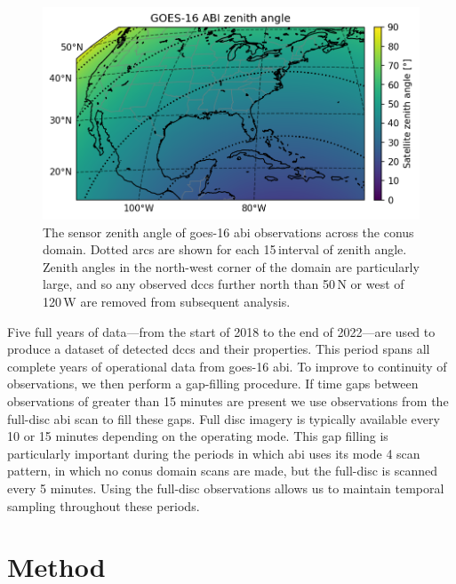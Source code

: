 \begin{figure}[tp]
    \centering
    \includegraphics[width=\textwidth]{figures/ch2_01.png}
    \caption[
    The sensor zenith angle of \acrshort{goes}-16 \acrshort{abi} observations across the \acrshort{conus} domain
    ]{
    The sensor zenith angle of \acrshort{goes}-16 \acrshort{abi} observations across the \acrshort{conus} domain. Dotted arcs are shown for each 15\,\textdegree interval of zenith angle. Zenith angles in the north-west corner of the domain are particularly large, and so any observed \acrshort{dcc}s further north than 50\,\textdegree N or west of 120\,\textdegree W are removed from subsequent analysis.
    }
    \label{fig:abi_zenith_angles}
\end{figure}

Five full years of data---from the start of 2018 to the end of 2022---are used to produce a dataset of detected \acrshort{dcc}s and their properties.
This period spans all complete years of operational data from \acrshort{goes}-16 \acrshort{abi}.
To improve to continuity of observations, we then perform a gap-filling procedure.
If time gaps between observations of greater than 15 minutes are present we use observations from the full-disc \acrshort{abi} scan to fill these gaps.
Full disc imagery is typically available every 10 or 15 minutes depending on the operating mode.
This gap filling is particularly important during the periods in which \acrshort{abi} uses its mode 4 scan pattern, in which no \acrshort{conus} domain scans are made, but the full-disc is scanned every 5 minutes.
Using the full-disc observations allows us to maintain temporal sampling throughout these periods.


\section{Method}

